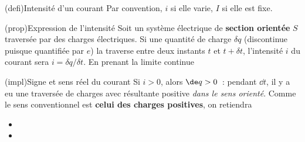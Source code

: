 \documentclass[../../main/main.tex]{subfiles}
\begin{document}
\begin{tcb*}[label=def:intensité, sidebyside](defi){Intensité d'un courant}
	\tcblower
	Par convention, $i$ si elle varie, $I$ si elle est fixe.
\end{tcb*}
\begin{tcb*}[label=prop:intensité](prop){Expression de l'intensité}
	Soit un système électrique de \textbf{section orientée} $S$ traversée par
	des charges électriques. Si une quantité de charge $\delta q$ (discontinue
	puisque quantifiée par $e$) la traverse entre deux instants $t$ et $t + \delta
		t$, l'intensité $i$ du courant sera $i = \delta q/\delta t$. En prenant
	la limite continue
	\psw{%
		\[
			\boxed{
				i(t) =
				\lim_{\delta t \ra 0} \frac{\delta q}{\delta t} =
				\dv{q}{t}
			}%
		\]
	}%
	\vspace{-15pt}
\end{tcb*}
\begin{tcb}[label=impl:intensconv](impl){Signe et sens réel du courant}
	Si $i > 0$, alors $\de q > 0$~: pendant $\dd{t}$, il y a eu une traversée
	de charges avec résultante positive \textit{dans le sens orienté}. Comme le
	sens conventionnel est \textbf{celui des charges positives}, on retiendra
	\begin{itemize}
		\item {}%
		\item {}%
	\end{itemize}
\end{tcb}
\end{document}
